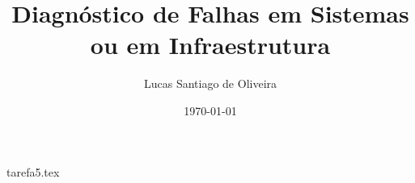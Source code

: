 \documentclass{article}
\title{Diagnóstico de Falhas em Sistemas ou em Infraestrutura}
\author{Lucas Santiago de Oliveira}
\date{\today}
\begin{document}
    \maketitle

    {tarefa5.tex}
\end{document}
